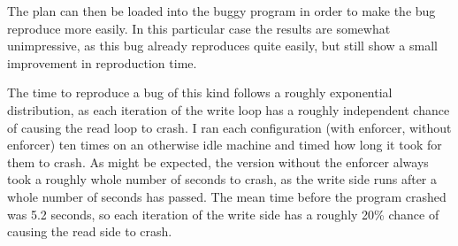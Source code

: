 
The plan can then be loaded into the buggy program in order to make
the bug reproduce more easily.  In this particular case the results
are somewhat unimpressive, as this bug already reproduces quite
easily, but still show a small improvement in reproduction
time.

The time to reproduce a bug of this kind follows a roughly exponential
distribution, as each iteration of the write loop has a roughly
independent chance of causing the read loop to crash.  I ran each
configuration (with enforcer, without enforcer) ten times on an
otherwise idle machine and timed how long it took for them to crash.
As might be expected, the version without the enforcer always took a
roughly whole number of seconds to crash, as the write side runs after
a whole number of seconds has passed.  The mean time before the
program crashed was 5.2 seconds, so each iteration of the write side
has a roughly 20\% chance of causing the read side to
crash.

